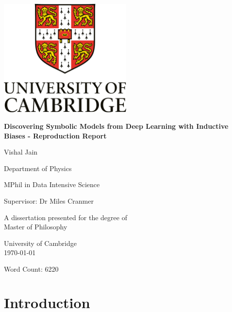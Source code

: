 \documentclass[11pt]{article}
\begin{document}
\begin{titlepage}
    \centering
    \vspace*{1cm}
    
    \includegraphics[width=0.5\textwidth]{figs/logo.png} %
    
    \vspace{1.5cm}
    
    {\Large\bfseries Discovering Symbolic Models from Deep Learning with Inductive Biases - Reproduction Report\par}
    
    \vspace{2cm}
    
    {\Large Vishal Jain \par}
    
    \vspace{1cm}
    
    {\large Department of Physics \par}
    \vspace{1cm}
    {\large MPhil in Data Intensive Science \par}
    \vspace{1cm}
    {\large Supervisor: Dr Miles Cranmer \par}
    
    \vfill
    A dissertation presented for the degree of\\
    Master of Philosophy
    
    \vspace{0.8cm}
    
    \Large University of Cambridge\\
    \today %
    
\end{titlepage}
Word Count: 6220
\tableofcontents
\newpage
\section{Introduction}
\end{document}
